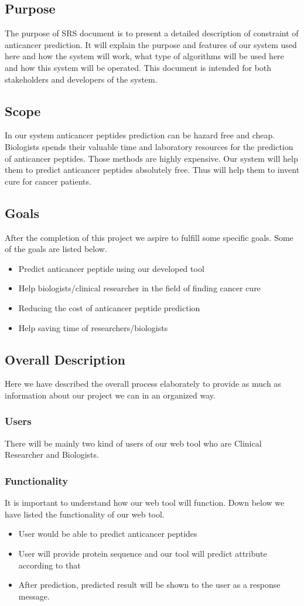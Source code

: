 \subsection{Purpose}
The purpose of SRS document is to present a detailed description of constraint of anticancer prediction. It will explain the purpose and features of our system used here and how the system will work, what type of algorithms will be used here and how this system will be operated. This document is intended for both stakeholders and developers of the system.
\subsection{Scope}
In our system anticancer peptides prediction can be hazard free and cheap. Biologists spends their valuable time and laboratory resources for the prediction of anticancer peptides. Those methods are highly expensive. Our system will help them to predict anticancer peptides absolutely free. Thus will help them to invent cure for cancer patients.
\subsection{Goals}
After the completion of this project we aspire to fulfill some specific goals. Some of the goals are listed below. 
\begin{itemize}
\item Predict anticancer peptide using our developed tool
\item Help biologists/clinical researcher in the field of finding cancer cure
\item Reducing the cost of anticancer peptide prediction
\item Help saving time of researchers/biologists
\end{itemize}
\subsection{Overall Description}
Here we have described the overall process elaborately to provide as much as information about our project we can in an organized way.
\subsubsection{Users}
There will be mainly two kind of users of our web tool who are Clinical Researcher and Biologists.
\subsubsection{Functionality}
It is important to understand how our web tool will function. Down below we have listed the functionality of our web tool.
\begin{itemize}
\item User would be able to predict anticancer peptides 
\item User will provide protein sequence and our tool will predict attribute according to that
\item After prediction, predicted result will be shown to the user as a response message.
\end{itemize}
